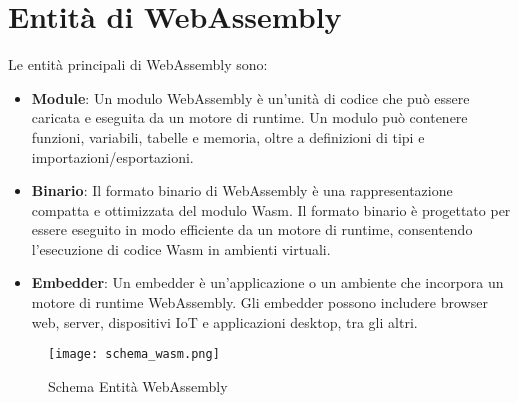 \documentclass[../../main.tex]{subfiles}
\begin{document}
\section{Entità di WebAssembly}
Le entità principali di WebAssembly sono:
\begin{itemize}
    \item \textbf{Module}: Un modulo WebAssembly è un'unità di codice che può essere caricata e eseguita da un motore di runtime. Un modulo può contenere funzioni, variabili, tabelle e memoria, oltre a definizioni di tipi e importazioni/esportazioni.
    \item \textbf{Binario}: Il formato binario di WebAssembly è una rappresentazione compatta e ottimizzata del modulo Wasm. Il formato binario è progettato per essere eseguito in modo efficiente da un motore di runtime, consentendo l'esecuzione di codice Wasm in ambienti virtuali.
    \item \textbf{Embedder}: Un embedder è un'applicazione o un ambiente che incorpora un motore di runtime WebAssembly. Gli embedder possono includere browser web, server, dispositivi IoT e applicazioni desktop, tra gli altri.
\end{itemize}

\begin{figure}[H]
    \centering
    \texttt{[image: schema\_wasm.png]}
    \caption{Schema Entità WebAssembly}
    \label{fig:wasm_entity}
\end{figure}
\end{document}
